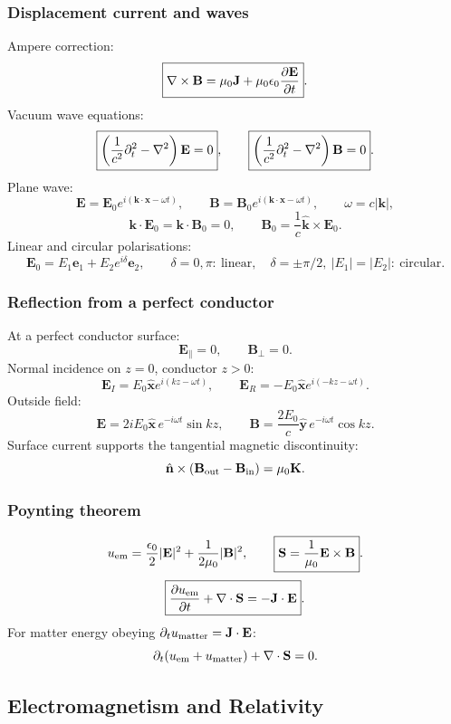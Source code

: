 \subsubsection*{Displacement current and waves}
Ampere correction:
\[
\boxed{\nabla\times\mathbf B=\mu_0\mathbf J+\mu_0\epsilon_0\frac{\partial\mathbf E}{\partial t}}.
\]
Vacuum wave equations:
\[
\boxed{\left(\frac{1}{c^2}\partial_t^2-\nabla^2\right)\mathbf E=0},\qquad
\boxed{\left(\frac{1}{c^2}\partial_t^2-\nabla^2\right)\mathbf B=0}.
\]
Plane wave:
\[
\mathbf E=\mathbf E_0e^{i(\mathbf k\cdot\mathbf x-\omega t)},\qquad
\mathbf B=\mathbf B_0e^{i(\mathbf k\cdot\mathbf x-\omega t)},\qquad
\omega=c|\mathbf k|,
\]
\[
\mathbf k\cdot\mathbf E_0=\mathbf k\cdot\mathbf B_0=0,\qquad
\boxed{\mathbf B_0=\frac{1}{c}\hat{\mathbf k}\times\mathbf E_0}.
\]
Linear and circular polarisations:
\[
\mathbf E_0=E_1\mathbf e_1+E_2e^{i\delta}\mathbf e_2,\qquad
\delta=0,\pi:\ \text{linear},\quad \delta=\pm\pi/2,\ |E_1|=|E_2|:\ \text{circular}.
\]

\subsubsection*{Reflection from a perfect conductor}
At a perfect conductor surface:
\[
\mathbf E_{\parallel}=0,\qquad \mathbf B_\perp=0.
\]
Normal incidence on $z=0$, conductor $z>0$:
\[
\mathbf E_I=E_0\hat{\mathbf x}e^{i(kz-\omega t)},\qquad
\mathbf E_R=-E_0\hat{\mathbf x}e^{i(-kz-\omega t)}.
\]
Outside field:
\[
\mathbf E=2iE_0\hat{\mathbf x}\,e^{-i\omega t}\sin kz,\qquad
\mathbf B=\frac{2E_0}{c}\hat{\mathbf y}\,e^{-i\omega t}\cos kz.
\]
Surface current supports the tangential magnetic discontinuity:
\[
\hat{\mathbf n}\times(\mathbf B_{\rm out}-\mathbf B_{\rm in})=\mu_0\mathbf K.
\]

\subsubsection*{Poynting theorem}
\[
u_{\rm em}=\frac{\epsilon_0}{2}|\mathbf E|^2+\frac{1}{2\mu_0}|\mathbf B|^2,\qquad
\boxed{\mathbf S=\frac{1}{\mu_0}\mathbf E\times\mathbf B}.
\]
\[
\boxed{\frac{\partial u_{\rm em}}{\partial t}+\nabla\cdot\mathbf S=-\mathbf J\cdot\mathbf E}.
\]
For matter energy obeying $\partial_tu_{\rm matter}=\mathbf J\cdot\mathbf E$:
\[
\partial_t(u_{\rm em}+u_{\rm matter})+\nabla\cdot\mathbf S=0.
\]

\subsection{Electromagnetism and Relativity}

